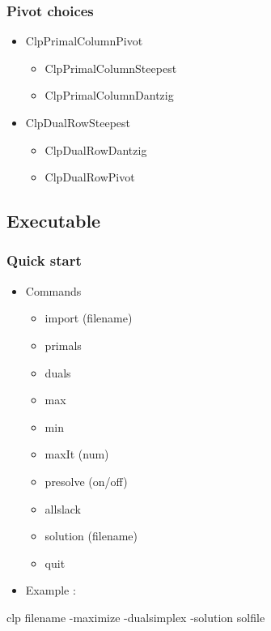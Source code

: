 \documentclass{beamer}
\begin{document}
{\Large
\begin{frame}
  \frametitle{Pivot choices}
  \begin{itemize}
  \item ClpPrimalColumnPivot
    {\Large
    \begin{itemize}
    \item ClpPrimalColumnSteepest
    \item ClpPrimalColumnDantzig
    \end{itemize}
    }
  \item ClpDualRowSteepest
    {\Large
    \begin{itemize}
    \item ClpDualRowDantzig
    \item ClpDualRowPivot
    \end{itemize}
    }
  \end{itemize}
\end{frame}
}

\subsection{Executable}

\begin{frame}
\frametitle{Quick start}
\begin{itemize}
\item Commands
\begin{itemize}
\item import (filename)
\item primals
\item duals
\item max
\item min
\item maxIt (num)
\item presolve (on/off)
\item allslack
\item solution (filename)
\item quit
\end{itemize}
\end{itemize}
\begin{itemize}
\item Example :
\end{itemize}
clp filename -maximize -dualsimplex -solution solfile
\end{frame}

\end{document}
